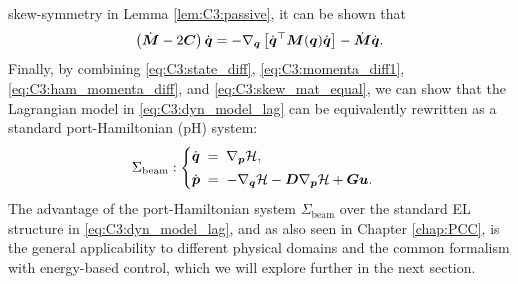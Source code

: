 skew-symmetry in Lemma \ref{lem:C3:passive}, it can be shown that
%
\begin{equation}
\left( \dot{\boldsymbol{M}} - 2\boldsymbol{C} \right) \dot{\boldsymbol{q}} =  -\nabla_{\boldsymbol{q}} \left[ \dot{\boldsymbol{q}}^\top \boldsymbol{M}(\boldsymbol{q}) \dot{\boldsymbol{q}} \right] - \dot{\boldsymbol{M}}\dot{\boldsymbol{q}}. \label{eq:C3:skew_mat_equal}
\end{equation}
%
Finally, by combining \eqref{eq:C3:state_diff}, \eqref{eq:C3:momenta_diff1}, \eqref{eq:C3:ham_momenta_diff}, and \eqref{eq:C3:skew_mat_equal}, we can show that the Lagrangian model in \eqref{eq:C3:dyn_model_lag} can be equivalently rewritten as a standard port-Hamiltonian (pH) system:
\begin{align}
\Sigma_{\textrm{beam}}: 
\begin{cases}
\dot{\boldsymbol{q}} \;=\; \nabla_{\boldsymbol{p}} \mathcal{H}, \\[0.25em]
\dot{\boldsymbol{p}} \;=\; -\nabla_{\boldsymbol{q}} \mathcal{H} - \boldsymbol{D}\nabla_{\boldsymbol{p}} \mathcal{H} + \boldsymbol{Gu}.
\end{cases}
\label{eq:C3:model_ph}
\end{align}
%
The advantage of the port-Hamiltonian system $\Sigma_\textrm{beam}$ over the standard EL structure in \eqref{eq:C3:dyn_model_lag}, and as also seen in Chapter \ref{chap:PCC}, is the general applicability to different physical domains and the common formalism with energy-based control, which we will explore further in the next section. 

